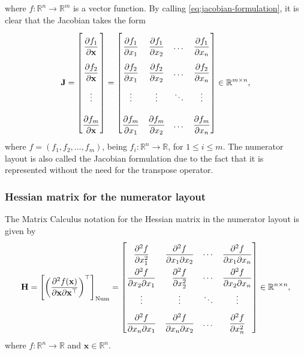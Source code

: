where \(f: \mathbb{R}^{n} \rightarrow \mathbb{R}^{m}\) is a vector function. By calling \eqref{eq:jacobian-formulation}, it is clear that the Jacobian takes the form
\begin{align}
    \label{eq:jacobian-matrix}
    \mathbf{J} = \renewcommand{\arraystretch}{2.6} \begin{bmatrix}
        \dfrac{\partial f_1}{\partial \mathbf{x}} \\
        \dfrac{\partial f_2}{\partial \mathbf{x}} \\ 
        \vdots \\ 
        \dfrac{\partial f_m}{\partial \mathbf{x}}
    \end{bmatrix} = \begin{bmatrix}
        \dfrac{\partial f_1}{\partial x_1} & \dfrac{\partial f_1}{\partial x_2} & \dots & \dfrac{\partial f_1}{\partial x_n} \\
        \dfrac{\partial f_2}{\partial x_1} & \dfrac{\partial f_2}{\partial x_2} & \dots & \dfrac{\partial f_2}{\partial x_n} \\
        \vdots & \vdots & \ddots & \vdots \\
        \dfrac{\partial f_m}{\partial x_1} & \dfrac{\partial f_m}{\partial x_2} & \dots & \dfrac{\partial f_m}{\partial x_n} \\
    \end{bmatrix} \in \mathbb{R}^{m \times n},
\end{align}
where \(f = (f_1, f_2, \dots, f_m)\), being \(f_i: \mathbb{R}^n \rightarrow \mathbb{R}\), for \(1 \leq i \leq m\). The numerator layout is also called the Jacobian formulation due to the fact that it is represented without the need for the transpose operator.

\subsubsection{Hessian matrix for the numerator layout}

The Matrix Calculus notation for the Hessian matrix in the numerator layout is given by
\begin{align}
    \label{eq:hessian-eq-numerator}
    \mathbf{H} = \left[ \left( \dfrac{\partial^{2} f(\mathbf{x})}{\partial \mathbf{x} \partial \mathbf{x}^\top} \right)^\top \right]_{\textnormal{Num}} = \renewcommand{\arraystretch}{2.2}\begin{bmatrix}
        \dfrac{\partial^{2} f}{\partial x_1^2} & \dfrac{\partial^{2} f}{\partial x_1 \partial x_2} & \cdots & \dfrac{\partial^{2} f}{\partial x_1 \partial x_n} \\
        \dfrac{\partial^{2} f}{\partial x_2 \partial x_1} & \dfrac{\partial^{2} f}{\partial x_2^2} & \cdots & \dfrac{\partial^{2} f}{\partial x_2 \partial x_n} \\
        \vdots & \vdots & \ddots & \vdots \\
        \dfrac{\partial^{2} f}{\partial x_n \partial x_1} & \dfrac{\partial^{2} f}{\partial x_n \partial x_2} & \dots & \dfrac{\partial^{2} f}{\partial x_n^2}
    \end{bmatrix} \in \mathbb{R}^{n \times n},
\end{align}
where \(f: \mathbb{R}^{n} \rightarrow \mathbb{R}\) and \(\mathbf{x} \in \mathbb{R}^{n}\).

